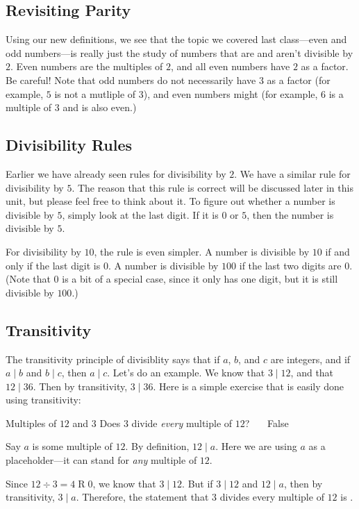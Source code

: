 \documentclass[a4paper,10pt]{report}
\begin{document}
\subsection{Revisiting Parity}

Using our new definitions, we see that the topic we covered last class---even
and odd numbers---is really just the study of numbers that are and aren't
divisible by \(2\). Even numbers are the multiples of \(2\), and all even
numbers have \(2\) as a factor. Be careful! Note that odd numbers do not
necessarily have \(3\) as a factor (for example, \(5\) is not a mutliple of
\(3\)), and even numbers might (for example, \(6\) is a multiple of \(3\) and
is also even.)

\subsection{Divisibility Rules}

Earlier we have already seen rules for divisibility by \(2\). We have a similar
rule for divisibility by \(5\). The reason that this rule is correct will be
discussed later in this unit, but please feel free to think about it. To figure
out whether a number is divisible by \(5\), simply look at the last digit. If
it is \(0\) or \(5\), then the number is divisible by \(5\).

For divisibility by \(10\), the rule is even simpler. A number is divisible by
\(10\) if and only if the last digit is \(0\). A number is divisible by \(100\)
if the last two digits are \(0\). (Note that \(0\) is a bit of a special case,
since it only has one digit, but it is still divisible by \(100\).)

\subsection{Transitivity}

The \gls{transitivity} principle of divisiblity says that if \(a\), \(b\), and
\(c\) are integers, and if \(a \mid b\) and \(b \mid c\), then \(a \mid c\).
Let's do an example. We know that \(3 \mid 12\), and that \(12 \mid 36\). Then
by transitivity, \(3 \mid 36\). Here is a simple exercise that is easily done
using transitivity:

\begin{problem}{Multiples of \(12\) and \(3\)}
 Does \(3\) divide \emph{every} multiple of \(12\)? \hfill {}~~~False

 \begin{solution}
  Say \(a\) is some multiple of \(12\). By definition, \(12 \mid a\). Here we
  are using \(a\) as a placeholder---it can stand for \emph{any} multiple of
  \(12\).

  Since \(12 \div 3 = 4 \operatorname{R} 0\), we know that \(3 \mid 12\). But
  if \(3 \mid 12\) and \(12 \mid a\), then by transitivity, \(3 \mid a\).
  Therefore, the statement that \(3\) divides every multiple of \(12\) is
  .
 \end{solution}
\end{problem}
\end{document}
